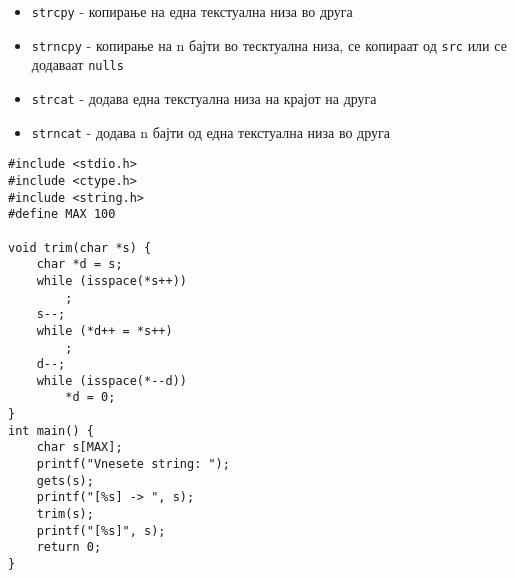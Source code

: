 

\begin{frame}{ 
}
\begin{itemize}
  \item \texttt{strcpy} - копирање на една текстуална низа во друга
  \item \texttt{strncpy} - копирање на n бајти во тесктуална низа, се
  копираат од \texttt{src} или се додаваат \texttt{nulls}
  \item \texttt{strcat} - додава една текстуална низа на крајот на друга
  \item \texttt{strncat} - додава n бајти од една текстуална низа во друга
\end{itemize}
\end{frame}


\begin{frame}[fragile]{
}{
}
\begin{lstlisting}
#include <stdio.h>
#include <ctype.h>
#include <string.h>
#define MAX 100

void trim(char *s) {
    char *d = s;
    while (isspace(*s++))
        ;
    s--;
    while (*d++ = *s++)
        ;
    d--;
    while (isspace(*--d))
        *d = 0;
}
int main() {
    char s[MAX];
    printf("Vnesete string: ");
    gets(s);
    printf("[%s] -> ", s);
    trim(s);
    printf("[%s]", s);
    return 0;
}
\end{lstlisting}
\end{frame}

